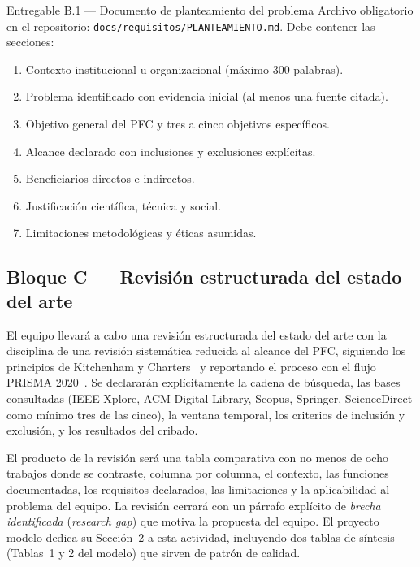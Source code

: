 \documentclass[11pt,a4paper]{article}
\begin{document}
\begin{cajaentregable}{Entregable B.1 --- Documento de planteamiento del problema}
Archivo obligatorio en el repositorio: \texttt{docs/requisitos/PLANTEAMIENTO.md}. Debe contener las secciones:
\begin{enumerate}
    \item Contexto institucional u organizacional (m\'aximo 300 palabras).
    \item Problema identificado con evidencia inicial (al menos una fuente citada).
    \item Objetivo general del PFC y tres a cinco objetivos espec\'ificos.
    \item Alcance declarado con inclusiones y exclusiones expl\'icitas.
    \item Beneficiarios directos e indirectos.
    \item Justificaci\'on cient\'ifica, t\'ecnica y social.
    \item Limitaciones metodol\'ogicas y \'eticas asumidas.
\end{enumerate}
\end{cajaentregable}

\subsection{Bloque C --- Revisi\'on estructurada del estado del arte}

El equipo llevar\'a a cabo una revisi\'on estructurada del estado del arte con la disciplina de una revisi\'on sistem\'atica reducida al alcance del PFC, siguiendo los principios de Kitchenham y Charters~\cite{kitchenham2007guidelines} y reportando el proceso con el flujo PRISMA 2020~\cite{page2021prisma}. Se declarar\'an expl\'icitamente la cadena de b\'usqueda, las bases consultadas (IEEE Xplore, ACM Digital Library, Scopus, Springer, ScienceDirect como m\'inimo tres de las cinco), la ventana temporal, los criterios de inclusi\'on y exclusi\'on, y los resultados del cribado.

El producto de la revisi\'on ser\'a una tabla comparativa con no menos de ocho trabajos donde se contraste, columna por columna, el contexto, las funciones documentadas, los requisitos declarados, las limitaciones y la aplicabilidad al problema del equipo. La revisi\'on cerrar\'a con un p\'arrafo expl\'icito de \emph{brecha identificada} (\emph{research gap}) que motiva la propuesta del equipo. El proyecto modelo dedica su Secci\'on~2 a esta actividad, incluyendo dos tablas de s\'intesis (Tablas~1 y 2 del modelo) que sirven de patr\'on de calidad.
\end{document}
